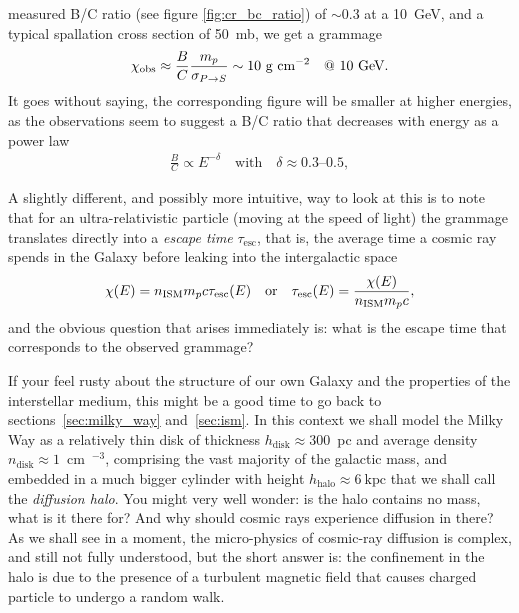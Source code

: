 measured B/C ratio (see figure \ref{fig:cr_bc_ratio}) of $\sim 0.3$ at a 10~GeV,
and a typical spallation cross section of 50~mb, we get a grammage
\begin{align*}
  \chi_\text{obs} \approx \frac{B}{C} \frac{m_p}{\sigma_{P\rightarrow S}}
  \sim 10~\text{g~cm}^{-2} \quad @\ 10~\text{GeV}.
\end{align*}
It goes without saying, the corresponding figure will be smaller at higher
energies, as the observations seem to suggest a B/C ratio that decreases with
energy as a power law
\begin{align}
  \frac{B}{C} \propto E^{-\delta} \quad\text{with}\quad \delta \approx 0.3\text{--}0.5,
\end{align}

\begin{marginfigure}
  
  \caption{Energy dependence of the B/C ratio measured by AMS-02~\cite{2021PhR...894....1A}.
    The data are consistent with a power law in energy above a few GeV.}
  \label{fig:cr_bc_ratio}
\end{marginfigure}

A slightly different, and possibly more intuitive, way to look at this is to note that
for an ultra-relativistic particle (moving at the speed of light) the grammage translates
directly into a \emph{escape time} $\tau_\text{esc}$, that is, the average time a cosmic
ray spends in the Galaxy before leaking into the intergalactic space
\begin{align*}
  \chi(E) = n_\text{ISM} m_p c \tau_\text{esc}(E) \quad\text{or}\quad
  \tau_\text{esc}(E) = \frac{\chi(E)}{n_\text{ISM} m_p c},
\end{align*}
and the obvious question that arises immediately is: what is the escape time that
corresponds to the observed grammage?

If your feel rusty about the structure of our own Galaxy and the properties of the
interstellar medium, this might be a good time to go back to sections~\ref{sec:milky_way}
and~\ref{sec:ism}. In this context we shall model the Milky Way as a relatively thin disk
of thickness $h_\text{disk} \approx 300$~pc and average density
$n_\text{disk} \approx 1$~cm~$^{-3}$, comprising the vast majority of the galactic mass,
and embedded in a much bigger cylinder with height $h_\text{halo} \approx 6~\text{kpc}$
that we shall call the \emph{diffusion halo}.
You might very well wonder: is the halo contains no mass, what is it there for? And why
should cosmic rays experience diffusion in there? As we shall see in a moment, the
micro-physics of cosmic-ray diffusion is complex, and still not fully understood,
but the short answer is: the confinement in the halo is due to the presence of a
turbulent magnetic field that causes charged particle to undergo a random walk.

